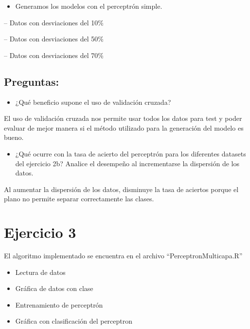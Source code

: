 \documentclass[]{book}
\providecommand{\tightlist}{%
  \setlength{\itemsep}{0pt}\setlength{\parskip}{0pt}}
\begin{document}
\begin{itemize}
\tightlist
\item
  Generamos los modelos con el perceptrón simple.
\end{itemize}

-- Datos con desviaciones del 10\%

-- Datos con desviaciones del 50\%

-- Datos con desviaciones del 70\%

\hypertarget{preguntas-1}{%
\subsection{Preguntas:}\label{preguntas-1}}

\begin{itemize}
\tightlist
\item
  ¿Qué beneficio supone el uso de validación cruzada?
\end{itemize}

El uso de validación cruzada nos permite usar todos los datos para test y poder evaluar de mejor manera si el método utilizado para la generación del modelo es bueno.

\begin{itemize}
\tightlist
\item
  ¿Qué ocurre con la tasa de acierto del perceptrón para los diferentes datasets del ejercicio 2b? Analice el desempeño al incrementarse la dispersión de los datos.
\end{itemize}

Al aumentar la dispersión de los datos, disminuye la tasa de aciertos porque el plano no permite separar correctamente las clases.

\hypertarget{ejercicio-3}{%
\section{Ejercicio 3}\label{ejercicio-3}}

El algoritmo implementado se encuentra en el archivo ``PerceptronMulticapa.R''

\begin{itemize}
\item
  Lectura de datos
\item
  Gráfica de datos con clase
\item
  Entrenamiento de perceptrón
\item
  Gráfica con clasificación del perceptron
\end{itemize}
\end{document}
